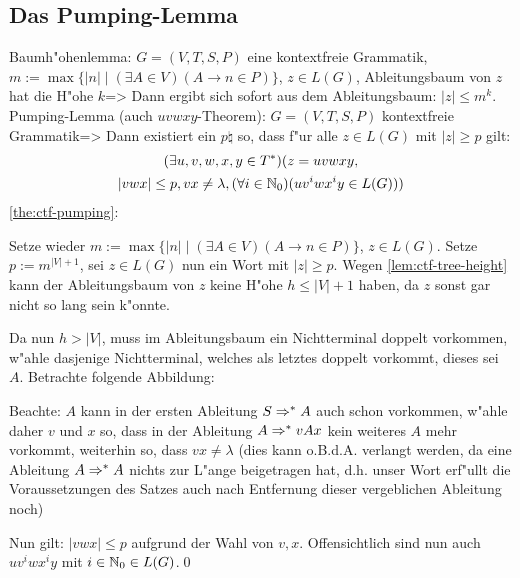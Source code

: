 \subsection{Das Pumping-Lemma}
\label{sub:ctf-pumping}
\lemma Baumh"ohenlemma:
  $G=(V,T,S,P)$ eine kontextfreie Grammatik, 
  $m:=\max\{|n|\mid(\exists A\in V)(A\to n\in P)\}$, $z\in L(G)$,
  Ableitungsbaum von $z$ hat die H"ohe $k$=>{
  \label{lem:ctf-tree-height}
  Dann ergibt sich sofort aus dem Ableitungsbaum: $|z|\le m^k$.
  }
\theorem Pumping-Lemma (auch $uvwxy$-Theorem):
  $G=(V,T,S,P)$ kontextfreie Grammatik=>{
  \label{the:ctf-pumping}
  Dann existiert ein $p\natural$ so, dass f"ur alle $z\in L(G)$ mit
  $|z|\ge p$ gilt:
  \begin{multline*}
    (\exists u,v,w,x,y\in T^*)(z=uvwxy,\\
    |vwx|\le p,vx\ne\lambda,(\forall i\in\mathbb N_0)(uv^iwx^iy\in L(G)))
    \end{multline*}
  }
\proof \ref{the:ctf-pumping}:{
  Setze wieder $m:=\max\{|n|\mid(\exists A\in V)(A\to n\in P)\}$, $z\in L(G)$.
  Setze $p:=m^{|V|+1}$, sei $z\in L(G)$ nun ein Wort mit $|z|\ge p$. Wegen
  \ref{lem:ctf-tree-height} kann der Ableitungsbaum von $z$ keine H"ohe 
  $h\le|V|+1$ haben, da $z$ sonst gar nicht so lang sein k"onnte.
  
  Da nun $h>|V|$, muss im Ableitungsbaum ein Nichtterminal doppelt vorkommen,
  w"ahle dasjenige Nichtterminal, welches als letztes doppelt vorkommt,
  dieses sei $A$. Betrachte folgende Abbildung:
  \begin{center}\end{center}
  Beachte: $A$ kann in der ersten Ableitung $S\Rightarrow^* A$ auch schon vorkommen,
  w"ahle daher $v$ und $x$ so, dass in der Ableitung $A\Rightarrow^* vAx$ kein
  weiteres $A$ mehr vorkommt, weiterhin so, dass $vx\ne\lambda$ (dies kann 
  o.B.d.A. verlangt werden, da eine Ableitung $A\Rightarrow^* A$ nichts zur
  L"ange beigetragen hat, d.h. unser Wort erf"ullt die Voraussetzungen des
  Satzes auch nach Entfernung dieser vergeblichen Ableitung noch)
  
  Nun gilt: $|vwx|\le p$ aufgrund der Wahl von $v,x$. 
  Offensichtlich sind nun auch $uv^iwx^iy$ mit $i\in\mathbb N_0\in L(G)$.\qed
  }

